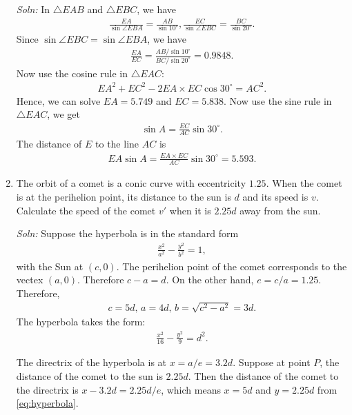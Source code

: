 \documentclass{article}
\begin{document}
\begin{enumerate}
  \emph{Soln:} In $\triangle EAB$ and $\triangle EBC$, we have
  \begin{align*}
    \frac{EA}{\sin \angle EBA} = \frac{AB}{\sin 10^\circ}, \frac{EC}{\sin \angle EBC} = \frac{BC}{\sin 20^\circ}.
  \end{align*}
  Since $\sin \angle EBC = \sin \angle EBA$, we have
  \begin{align*}
    \frac{EA}{EC} = \frac{AB/\sin 10^\circ}{BC/\sin 20^\circ} = 0.9848.
  \end{align*}
  Now use the cosine rule in $\triangle EAC$:
  \begin{align*}
    EA^2+ EC^2 - 2EA\times EC\cos 30^\circ=AC^2.
  \end{align*}
  Hence, we can solve $EA = 5.749$ and $EC = 5.838$. Now use the sine rule in $\triangle EAC$, we get
  \begin{align*}
   \sin A = \frac{EC}{AC}\sin 30^\circ.
  \end{align*}
  The distance of $E$ to the line $AC$ is
  \begin{align*}
    EA \sin A = \frac{EA\times EC}{AC}\sin 30^\circ = 5.593.
  \end{align*}

\newpage




\item The orbit of a comet is a conic curve with eccentricity $1.25$. When the comet is at the perihelion point, its distance to the sun is $d$ and its speed is $v$. Calculate the speed of the comet $v'$ when it is $2.25d$ away from the sun.

  \emph{Soln:} Suppose the hyperbola is in the standard form
  \begin{align*}
    \frac{x^2}{a^2} - \frac{y^2}{b^2} = 1,
  \end{align*}
  with the Sun at $(c,0)$. The perihelion point of the comet corresponds to the vectex $(a,0)$. Therefore $c-a = d$. On the other hand, $e = c/a = 1.25$. Therefore,
  \begin{align*}
    c=5d,\, a = 4d,\,b = \sqrt{c^2-a^2} = 3d.
  \end{align*}
  The hyperbola takes the form:
  \begin{align}
    \frac{x^2}{16} - \frac{y^2}{9} = d^2.
    \label{eq:hyperbola}
  \end{align}


  The directrix of the hyperbola is at $x = a/e = 3.2d$. Suppose at point $P$, the distance of the comet to the sun is $2.25d$. Then the distance of the comet to the directrix is $x-3.2d = 2.25d/e$, which means $x = 5d$ and $y  = 2.25d$ from \eqref{eq:hyperbola}.


\end{enumerate}
\end{document}
